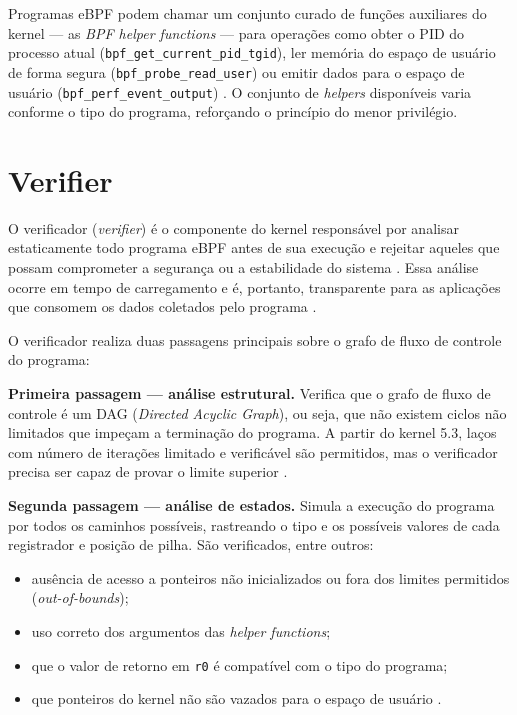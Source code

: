 Programas eBPF podem chamar um conjunto curado de funções auxiliares do kernel
— as \textit{BPF helper functions} — para operações como obter o PID do processo
atual (\texttt{bpf\_get\_current\_pid\_tgid}), ler memória do espaço de usuário
de forma segura (\texttt{bpf\_probe\_read\_user}) ou emitir dados para o espaço
de usuário (\texttt{bpf\_perf\_event\_output}) \cite{linuxkernel2024}.
O conjunto de \textit{helpers} disponíveis varia conforme o tipo do programa,
reforçando o princípio do menor privilégio.

\section{Verifier}

O verificador (\textit{verifier}) é o componente do kernel responsável por analisar
estaticamente todo programa eBPF antes de sua execução e rejeitar aqueles que
possam comprometer a segurança ou a estabilidade do sistema
\cite{linuxkernel2024}.
Essa análise ocorre em tempo de carregamento e é, portanto, transparente para as
aplicações que consomem os dados coletados pelo programa \cite{gregg2019}.

O verificador realiza duas passagens principais sobre o grafo de fluxo de controle
do programa:

\textbf{Primeira passagem — análise estrutural.}
Verifica que o grafo de fluxo de controle é um DAG (\textit{Directed Acyclic
Graph}), ou seja, que não existem ciclos não limitados que impeçam a terminação
do programa.
A partir do kernel 5.3, laços com número de iterações limitado e verificável são
permitidos, mas o verificador precisa ser capaz de provar o limite superior
\cite{linuxkernel2024}.

\textbf{Segunda passagem — análise de estados.}
Simula a execução do programa por todos os caminhos possíveis, rastreando o tipo
e os possíveis valores de cada registrador e posição de pilha.
São verificados, entre outros:

\begin{itemize}
  \item ausência de acesso a ponteiros não inicializados ou fora dos limites
        permitidos (\textit{out-of-bounds});
  \item uso correto dos argumentos das \textit{helper functions};
  \item que o valor de retorno em \texttt{r0} é compatível com o tipo do programa;
  \item que ponteiros do kernel não são vazados para o espaço de usuário
        \cite{linuxkernel2024}.
\end{itemize}


